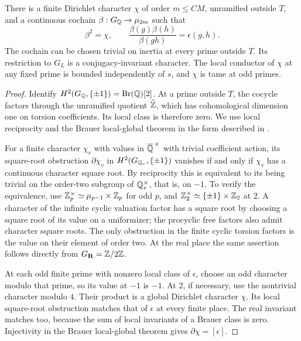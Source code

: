 \begin{lemma}
\label{hei:sign-splitting}
There is a finite Dirichlet character $\chi$ of order $m\le C M$,
unramified outside $T$, and a continuous cochain
$\beta:G_\mathbb Q\to\mu_{2m}$ such that
\begin{equation}\label{hei:beta}
 \beta^2=\chi,\qquad
 \frac{\beta(g)\beta(h)}{\beta(gh)}=\epsilon(g,h).
\end{equation}
The cochain can be chosen trivial on inertia at every prime outside
$T$.  Its restriction to $G_L$ is a conjugacy-invariant character.
The local conductor of $\chi$ at any fixed prime is bounded
independently of $s$, and $\chi$ is tame at odd primes.
\end{lemma}

\begin{proof}
Identify
$H^2(G_\mathbb Q,\{\pm1\})=\operatorname{Br}(\mathbb Q)[2]$.  At a prime
outside $T$, the cocycle factors through the unramified quotient
$\widehat{\mathbb Z}$, which has cohomological dimension one on torsion
coefficients.  Its local class is therefore zero.  We use local
reciprocity and the Brauer local-global theorem in the form described
in \cite{Serre1979,MilneCFT2020,MilneEtale2013}.

For a finite character $\chi_v$ with values in
$\overline{\mathbb Q}^{\,\times}$ with trivial coefficient action, its
square-root obstruction $\partial\chi_v$ in
$H^2(G_{\mathbb Q_v},\{\pm1\})$ vanishes if and only if $\chi_v$ has a
continuous character square root.  By reciprocity this is equivalent
to its being trivial on the order-two subgroup of $\mathbb Q_v^\times$,
that is, on $-1$.  To verify the equivalence, use
$\mathbb Z_p^\times\simeq\mu_{p-1}\times\mathbb Z_p$ for odd $p$, and
$\mathbb Z_2^\times\simeq\{\pm1\}\times\mathbb Z_2$ at $2$.  A character of the
infinite cyclic valuation factor has a square root by choosing a
square root of its value on a uniformizer; the procyclic free factors
also admit character square roots.  The only obstruction in the
finite cyclic torsion factors is the value on their element of order
two.  At the real place the same assertion follows directly from
$G_{\mathbf R}=\mathbb Z/2\mathbb Z$.

At each odd finite prime with nonzero local class of $\epsilon$,
choose an odd character modulo that prime, so its value at $-1$ is
$-1$.  At $2$, if necessary, use the nontrivial character modulo
$4$.  Their product is a global Dirichlet character $\chi$.  Its
local square-root obstruction matches that of $\epsilon$ at every
finite place.  The real invariant matches too, because the sum of
local invariants of a Brauer class is zero.  Injectivity in the
Brauer local-global theorem gives $\partial\chi=[\epsilon]$.


\end{proof}
